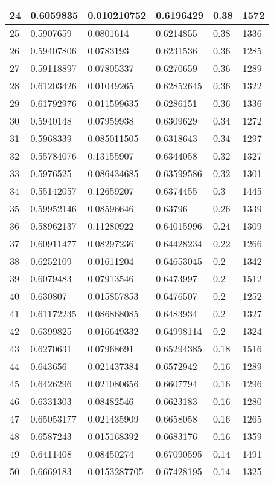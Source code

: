 \begin{longtable}{|l|l|l|l|l|l|}
24 & 0.6059835 & 0.010210752 & 0.6196429 & 0.38 & 1572 \\ \hline 
25 & 0.5907659 & 0.0801614 & 0.6214855 & 0.38 & 1336 \\ \hline 
26 & 0.59407806 & 0.0783193 & 0.6231536 & 0.36 & 1285 \\ \hline 
27 & 0.59118897 & 0.07805337 & 0.6270659 & 0.36 & 1289 \\ \hline 
28 & 0.61203426 & 0.01049265 & 0.62852645 & 0.36 & 1322 \\ \hline 
29 & 0.61792976 & 0.011599635 & 0.6286151 & 0.36 & 1336 \\ \hline 
30 & 0.5940148 & 0.07959938 & 0.6309629 & 0.34 & 1272 \\ \hline 
31 & 0.5968339 & 0.085011505 & 0.6318643 & 0.34 & 1297 \\ \hline 
32 & 0.55784076 & 0.13155907 & 0.6344058 & 0.32 & 1327 \\ \hline 
33 & 0.5976525 & 0.086434685 & 0.63599586 & 0.32 & 1301 \\ \hline 
34 & 0.55142057 & 0.12659207 & 0.6374455 & 0.3 & 1445 \\ \hline 
35 & 0.59952146 & 0.08596646 & 0.63796 & 0.26 & 1339 \\ \hline 
36 & 0.58962137 & 0.11280922 & 0.64015996 & 0.24 & 1309 \\ \hline 
37 & 0.60911477 & 0.08297236 & 0.64428234 & 0.22 & 1266 \\ \hline 
38 & 0.6252109 & 0.01611204 & 0.64653045 & 0.2 & 1342 \\ \hline 
39 & 0.6079483 & 0.07913546 & 0.6473997 & 0.2 & 1512 \\ \hline 
40 & 0.630807 & 0.015857853 & 0.6476507 & 0.2 & 1252 \\ \hline 
41 & 0.61172235 & 0.086868085 & 0.6483934 & 0.2 & 1327 \\ \hline 
42 & 0.6399825 & 0.016649332 & 0.64998114 & 0.2 & 1324 \\ \hline 
43 & 0.6270631 & 0.07968691 & 0.65294385 & 0.18 & 1516 \\ \hline 
44 & 0.643656 & 0.021437384 & 0.6572942 & 0.16 & 1289 \\ \hline 
45 & 0.6426296 & 0.021080656 & 0.6607794 & 0.16 & 1296 \\ \hline 
46 & 0.6331303 & 0.08482546 & 0.6623183 & 0.16 & 1280 \\ \hline 
47 & 0.65053177 & 0.021435909 & 0.6658058 & 0.16 & 1265 \\ \hline 
48 & 0.6587243 & 0.015168392 & 0.6683176 & 0.16 & 1359 \\ \hline 
49 & 0.6411408 & 0.08450274 & 0.67090595 & 0.14 & 1491 \\ \hline 
50 & 0.6669183 & 0.0153287705 & 0.67428195 & 0.14 & 1325 \\ \hline 
\end{longtable}